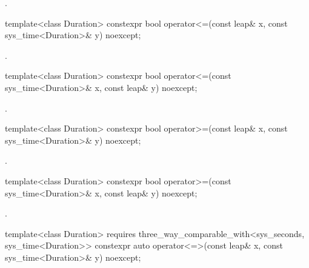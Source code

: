 \begin{itemdescr}
\pnum
\returns
{}.
\end{itemdescr}

%
%
\begin{itemdecl}
template<class Duration>
  constexpr bool operator<=(const leap& x, const sys_time<Duration>& y) noexcept;
\end{itemdecl}

\begin{itemdescr}
\pnum
\returns
{}.
\end{itemdescr}

%
%
\begin{itemdecl}
template<class Duration>
  constexpr bool operator<=(const sys_time<Duration>& x, const leap& y) noexcept;
\end{itemdecl}

\begin{itemdescr}
\pnum
\returns
{}.
\end{itemdescr}

%
%
\begin{itemdecl}
template<class Duration>
  constexpr bool operator>=(const leap& x, const sys_time<Duration>& y) noexcept;
\end{itemdecl}

\begin{itemdescr}
\pnum
\returns
{}.
\end{itemdescr}

%
%
\begin{itemdecl}
template<class Duration>
  constexpr bool operator>=(const sys_time<Duration>& x, const leap& y) noexcept;
\end{itemdecl}

\begin{itemdescr}
\pnum
\returns
{}.
\end{itemdescr}

%
%
\begin{itemdecl}
template<class Duration>
  requires three_way_comparable_with<sys_seconds, sys_time<Duration>>
  constexpr auto operator<=>(const leap& x, const sys_time<Duration>& y) noexcept;
\end{itemdecl}

